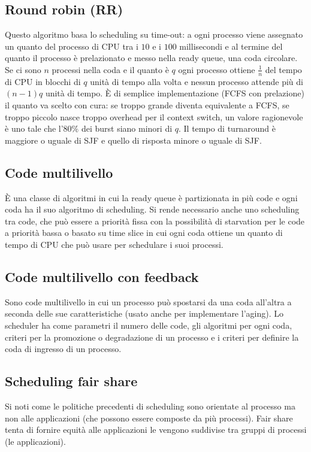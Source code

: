 \subsection{Round robin (RR)}
Questo algoritmo basa lo scheduling su time-out: a ogni processo viene assegnato un quanto del processo di CPU tra i $10$ e i $100$ millisecondi e al termine del quanto il processo \`e
prelazionato e messo nella ready queue, una coda circolare. Se ci sono $n$ processi nella coda e il quanto \`e $q$ ogni processo ottiene $\frac{1}{n}$ del tempo di CPU in blocchi di 
$q$ unit\`a di tempo alla volta e nessun processo attende pi\`u di $(n-1)q$ unit\`a di tempo. \`E di semplice implementazione (FCFS con prelazione) il quanto va scelto con cura: 
se troppo grande diventa equivalente a FCFS, se troppo piccolo nasce troppo overhead per il context switch, un valore ragionevole \`e uno tale che l'$80\%$ dei burst siano minori di $q$.
Il tempo di turnaround \`e maggiore o uguale di SJF e quello di risposta minore o uguale di SJF. 
\subsection{Code multilivello}
\`E una classe di algoritmi in cui la ready queue \`e partizionata in pi\`u code e ogni coda ha il suo algoritmo di scheduling. Si rende necessario anche uno scheduling tra code, che
pu\`o essere a priorit\`a fissa con la possibilit\`a di starvation per le code a priorit\`a bassa o basato su time slice in cui ogni coda ottiene un quanto di tempo di CPU che pu\`o 
usare per schedulare i suoi processi. 
\subsection{Code multilivello con feedback}
Sono code multilivello in cui un processo pu\`o spostarsi da una coda all'altra a seconda delle sue caratteristiche (usato anche per implementare l'aging). Lo scheduler ha come parametri
il numero delle code, gli algoritmi per ogni coda, criteri per la promozione o degradazione di un processo e i criteri per definire la coda di ingresso di un processo. 
\subsection{Scheduling fair share}
Si noti come le politiche precedenti di scheduling sono orientate al processo ma non alle applicazioni (che possono essere composte da pi\`u processi). Fair share tenta di fornire
equit\`a alle applicazioni le vengono suddivise tra gruppi di processi (le applicazioni). 
